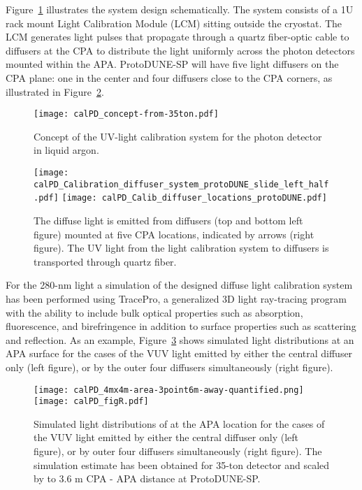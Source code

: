 Figure~\ref{fig:fig-c-1} illustrates the system design schematically. The system consists of a 1U rack mount Light Calibration Module (LCM) sitting outside the cryostat. The LCM generates light pulses that propagate through a quartz fiber-optic cable to diffusers at the CPA to distribute the light uniformly across the photon detectors mounted within the APA.  ProtoDUNE-SP will have five light 
diffusers on the CPA plane: one in the center and four diffusers close to the CPA corners, as illustrated in Figure~\ref{fig:fig-c-2}. 
%
 \begin{figure}[h]
  \centering
\texttt{[image: calPD\_concept-from-35ton.pdf]}
\caption{Concept of the UV-light calibration system for the photon detector in liquid argon.}
\label{fig:fig-c-1}
\end{figure}
%
%
 \begin{figure}[h]
  \centering
\texttt{[image: calPD\_Calibration\_diffuser\_system\_protoDUNE\_slide\_left\_half.pdf]}
\texttt{[image: calPD\_Calib\_diffuser\_locations\_protoDUNE.pdf]}
\caption{The diffuse light is emitted from diffusers (top and bottom left figure) mounted at five CPA locations, indicated by arrows (right figure). 
The UV light from the light calibration system to diffusers is transported through quartz fiber.}
\label{fig:fig-c-2}
\end{figure}

%
%
For the 280-nm light  a simulation of the designed diffuse light calibration system has been performed using TracePro, a generalized 3D light ray-tracing program with the ability 
to include bulk optical properties such as absorption, fluorescence, and birefringence in addition to surface properties such as scattering and reflection. 
As an example, Figure~\ref{fig:fig-c-4} shows simulated light distributions at an APA surface for the cases of the VUV light emitted by either the central diffuser only (left figure), 
or by the outer four diffusers simultaneously (right figure). 

%
 \begin{figure}[h]
  \centering
\texttt{[image: calPD\_4mx4m-area-3point6m-away-quantified.png]}
\texttt{[image: calPD\_figR.pdf]}
\caption{Simulated light distributions of at the APA location for the cases of the VUV light emitted by either the central diffuser only (left figure), or by outer four diffusers simultaneously (right figure).
The simulation estimate has been obtained for 35-ton detector and scaled by to 3.6 m CPA - APA distance at ProtoDUNE-SP.}
\label{fig:fig-c-4}
\end{figure}
%

